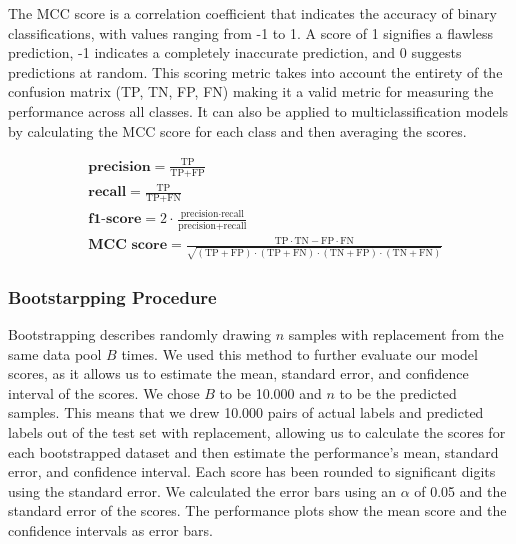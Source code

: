 \documentclass{bioinfo}
\begin{document}
\begin{methods}
The MCC score is a correlation coefficient that indicates the accuracy of binary classifications, with values ranging from -1 to 1. 
A score of 1 signifies a flawless prediction, -1 indicates a completely inaccurate prediction, and 0 suggests predictions at random.
This scoring metric takes into account the entirety of the confusion matrix (TP, TN, FP, FN) making it a valid
metric for measuring the performance across all classes.
It can also be applied to multiclassification models by calculating the MCC score for each class and then averaging the scores.

\begin{align}
	&\textbf{precision} = \frac{\text{TP}}{\text{TP} + \text{FP}} \\
    &\textbf{recall} = \frac{\text{TP}}{\text{TP} + \text{FN}} \\
    &\textbf{f1-score} = 2 \cdot \frac{\text{precision} \cdot \text{recall}}{\text{precision} + \text{recall}} \\
    &\textbf{MCC score} = \frac{\text{TP} \cdot \text{TN} - \text{FP} \cdot \text{FN}}{\sqrt{(\text{TP} + \text{FP}) \cdot (\text{TP} + \text{FN}) \cdot (\text{TN} + \text{FP}) \cdot (\text{TN} + \text{FN})}}
\end{align}




\subsubsection{Bootstarpping Procedure}
Bootstrapping describes randomly drawing $n$ samples with replacement from the same data pool $B$ times.
We used this method to further evaluate our model scores, as it allows us to estimate the mean, standard error, and confidence interval of the scores.
We chose $B$ to be 10.000 and $n$ to be the predicted samples.
This means that we drew 10.000 pairs of actual labels and predicted labels out of the test set with replacement,
allowing us to calculate the scores for each bootstrapped dataset and then estimate the performance's mean, 
standard error, and confidence interval.
Each score has been rounded to significant digits using the standard error.
We calculated the error bars using an $\alpha$ of 0.05 and the standard error of the scores.
The performance plots show the mean score and the confidence intervals as error bars.

\end{methods}
\end{document}

